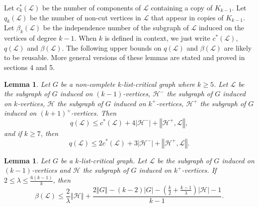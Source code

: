 \documentclass[10pt]{article}
\theoremstyle{plain}
\newtheorem{lem}[thm]{Lemma}
\theoremstyle{definition}
\theoremstyle{remark}
\newcommand{\fancy}[1]{\mathcal{#1}}
\renewcommand{\L}{\fancy{L}}
\newcommand{\HH}{\fancy{H}}
\newcommand{\card}[1]{\left|#1\right|}
\newcommand{\size}[1]{\left\Vert#1\right\Vert}
\newcommand{\parens}[1]{\left( #1 \right)}
\begin{document}
Let $c_k^*(\L)$ be the number of components of $\L$ containing a copy of $K_{k-1}$. Let $q_k(\L)$ be the number of non-cut vertices in $\L$ that appear in copies of $K_{k-1}$.  
Let $\beta_k(\L)$ be the independence number of the subgraph of $\L$ induced on the vertices of degree $k-1$.  
When $k$ is defined in context, we just write $c^*(\L)$, $q(\L)$ and $\beta(\L)$.  
The following upper bounds on $q(\L)$ and $\beta(\L)$ are likely to be reusable.  More general versions of these lemmas are stated and proved in sections 4 and 5.

\begin{lem}\label{qLemmaList}
	Let $G$ be a non-complete $k$-list-critical graph where $k \ge 5$.  Let $\L$ be the subgraph of $G$ induced on $(k-1)$-vertices, $\HH^-$ the subgraph of $G$ induced on $k$-vertices, 
	$\HH$ the subgraph of $G$ induced on $k^+$-vertices, $\HH^+$ the subgraph of $G$ induced on $(k+1)^+$-vertices.  Then
	\[q(\L) \le c^*(\L) + 4\card{\HH^-} + \size{\HH^+, \L},\] and if $k \ge 7$, then
	\[q(\L) \le 2c^*(\L) + 3\card{\HH^-} + \size{\HH^+, \L}.\]
\end{lem}

\begin{lem}\label{betaLemmaList}
	Let $G$ be a $k$-list-critical graph.  Let $\L$ be the subgraph of $G$ induced on $(k-1)$-vertices and	$\HH$ the subgraph of $G$ induced on $k^+$-vertices.  
	If $2 \le \lambda \le \frac{6(k-1)}{k}$, then
	\[\beta(\L) \le \frac{2}{\lambda}\size{\HH} + \frac{2\size{G} - (k-2)\card{G} - \parens{\frac{k}{2} + \frac{k-1}{\lambda}}\card{\HH} - 1}{k-1}.\]
\end{lem}
\end{document}
